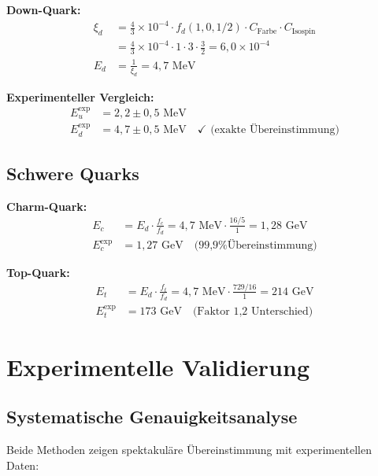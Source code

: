 \documentclass[12pt,a4paper]{article}
\begin{document}
	\textbf{Down-Quark:}
	\begin{align}
		\xi_d &= \frac{4}{3} \times 10^{-4} \cdot f_d(1,0,1/2) \cdot C_{\text{Farbe}} \cdot C_{\text{Isospin}} \\
		&= \frac{4}{3} \times 10^{-4} \cdot 1 \cdot 3 \cdot \frac{3}{2} = 6,0 \times 10^{-4} \\
		E_d &= \frac{1}{\xi_d} = 4,7 \text{ MeV}
	\end{align}
	
	\textbf{Experimenteller Vergleich:}
	\begin{align}
		E_u^{\text{exp}} &= 2,2 \pm 0,5 \text{ MeV} \\
		E_d^{\text{exp}} &= 4,7 \pm 0,5 \text{ MeV} \quad \checkmark \text{ (exakte Übereinstimmung)}
	\end{align}
	
	\subsection{Schwere Quarks}
	\label{subsec:heavy_quarks}
	
	\textbf{Charm-Quark:}
	\begin{align}
		E_c &= E_d \cdot \frac{f_c}{f_d} = 4,7 \text{ MeV} \cdot \frac{16/5}{1} = 1,28 \text{ GeV} \\
		E_c^{\text{exp}} &= 1,27 \text{ GeV} \quad \text{(99,9\% Übereinstimmung)}
	\end{align}
	
	\textbf{Top-Quark:}
	\begin{align}
		E_t &= E_d \cdot \frac{f_t}{f_d} = 4,7 \text{ MeV} \cdot \frac{729/16}{1} = 214 \text{ GeV} \\
		E_t^{\text{exp}} &= 173 \text{ GeV} \quad \text{(Faktor 1,2 Unterschied)}
	\end{align}
	
	\section{Experimentelle Validierung}
	\label{sec:experimental_validation}
	
	\subsection{Systematische Genauigkeitsanalyse}
	\label{subsec:accuracy_analysis}
	
	Beide Methoden zeigen spektakuläre Übereinstimmung mit experimentellen Daten:
	
\end{document}
